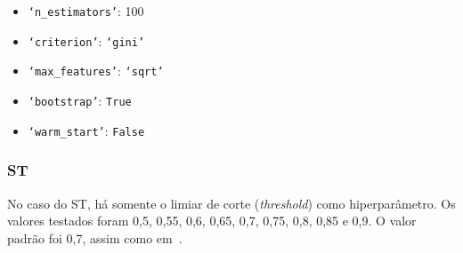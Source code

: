 \begin{itemize}
    \item \texttt{`n\_estimators'}: 100
    \item \texttt{`criterion'}: \texttt{`gini'}
    \item \texttt{`max\_features'}: \texttt{`sqrt'}
    \item \texttt{`bootstrap'}: \texttt{True}
    \item \texttt{`warm\_start'}: \texttt{False}
\end{itemize}


\subsubsection{ST}\label{subsubsec:st_hps}

No caso do ST, há somente o limiar de corte (\textit{threshold}) como hiperparâmetro. Os valores testados foram 0,5, 0,55, 0,6, 0,65, 0,7, 0,75, 0,8, 0,85 e 0,9. O valor padrão foi 0,7, assim como em~\cite{MagalhaesStatistical}.
